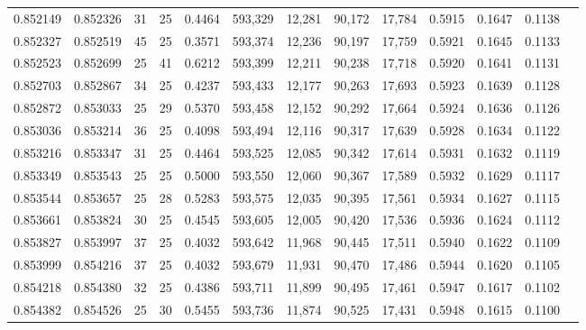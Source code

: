 \begin{tabular}{rrrrrrrrrrrrr}
0.852149 & 0.852326 &    31 &  25 &                                     0.4464 & 593,329 &  12,281 &  90,172 &  17,784 & 0.5915 & 0.1647 & 0.1138 \\
0.852327 & 0.852519 &    45 &  25 &                                     0.3571 & 593,374 &  12,236 &  90,197 &  17,759 & 0.5921 & 0.1645 & 0.1133 \\
0.852523 & 0.852699 &    25 &  41 &                                     0.6212 & 593,399 &  12,211 &  90,238 &  17,718 & 0.5920 & 0.1641 & 0.1131 \\
0.852703 & 0.852867 &    34 &  25 &                                     0.4237 & 593,433 &  12,177 &  90,263 &  17,693 & 0.5923 & 0.1639 & 0.1128 \\
0.852872 & 0.853033 &    25 &  29 &                                     0.5370 & 593,458 &  12,152 &  90,292 &  17,664 & 0.5924 & 0.1636 & 0.1126 \\
0.853036 & 0.853214 &    36 &  25 &                                     0.4098 & 593,494 &  12,116 &  90,317 &  17,639 & 0.5928 & 0.1634 & 0.1122 \\
0.853216 & 0.853347 &    31 &  25 &                                     0.4464 & 593,525 &  12,085 &  90,342 &  17,614 & 0.5931 & 0.1632 & 0.1119 \\
0.853349 & 0.853543 &    25 &  25 &                                     0.5000 & 593,550 &  12,060 &  90,367 &  17,589 & 0.5932 & 0.1629 & 0.1117 \\
0.853544 & 0.853657 &    25 &  28 &                                     0.5283 & 593,575 &  12,035 &  90,395 &  17,561 & 0.5934 & 0.1627 & 0.1115 \\
0.853661 & 0.853824 &    30 &  25 &                                     0.4545 & 593,605 &  12,005 &  90,420 &  17,536 & 0.5936 & 0.1624 & 0.1112 \\
0.853827 & 0.853997 &    37 &  25 &                                     0.4032 & 593,642 &  11,968 &  90,445 &  17,511 & 0.5940 & 0.1622 & 0.1109 \\
0.853999 & 0.854216 &    37 &  25 &                                     0.4032 & 593,679 &  11,931 &  90,470 &  17,486 & 0.5944 & 0.1620 & 0.1105 \\
0.854218 & 0.854380 &    32 &  25 &                                     0.4386 & 593,711 &  11,899 &  90,495 &  17,461 & 0.5947 & 0.1617 & 0.1102 \\
0.854382 & 0.854526 &    25 &  30 &                                     0.5455 & 593,736 &  11,874 &  90,525 &  17,431 & 0.5948 & 0.1615 & 0.1100 \\

\end{tabular}
